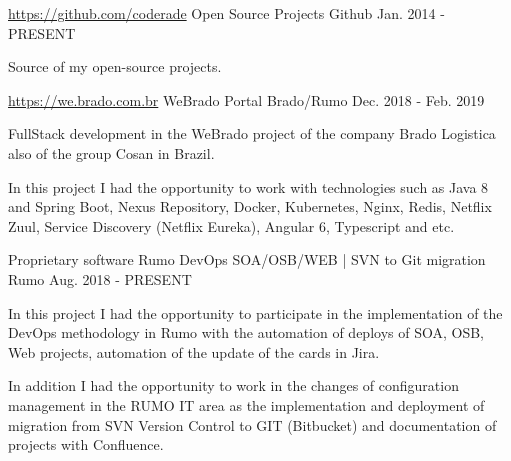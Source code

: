 

\begin{cventries}
  \cventry
    {\hyperref[https://github.com/coderade]{https://github.com/coderade}} %
    {Open Source Projects}%
    {Github} %
    {Jan. 2014 - PRESENT} %
    {
      \begin{cvitems} %
       \item{Source of my open-source projects.}
      \end{cvitems}
    }
\cventry
 {\hyperref[http://we.brado.com.br/v2]{https://we.brado.com.br}} %
{WeBrado Portal }%
{Brado/Rumo} %
{Dec. 2018 - Feb. 2019} %
{
  \begin{cvitems} %
   \item{FullStack development in the WeBrado project of the company Brado Logistica also of the group Cosan in Brazil.}
   \item{In this project I had the opportunity to work with technologies such as Java 8 and Spring Boot, Nexus Repository, Docker, Kubernetes, Nginx, Redis, Netflix Zuul, Service Discovery (Netflix Eureka), Angular 6, Typescript and etc.}
  \end{cvitems}
}
  \cventry
    {Proprietary software} %
    {Rumo DevOps SOA/OSB/WEB | SVN to Git migration }%
    {Rumo} %
    {Aug. 2018 - PRESENT} %
    {
      \begin{cvitems} %
       \item{In this project I had the opportunity to participate in the implementation of the DevOps methodology in Rumo with the automation of deploys of SOA, OSB, Web projects, automation of the update of the cards in Jira.}
       \item{In addition I had the opportunity to work in the changes of configuration management in the RUMO IT area as the implementation and deployment of migration from SVN Version Control to GIT (Bitbucket) and documentation of projects with Confluence.}
      \end{cvitems}
}
\end{cventries}

